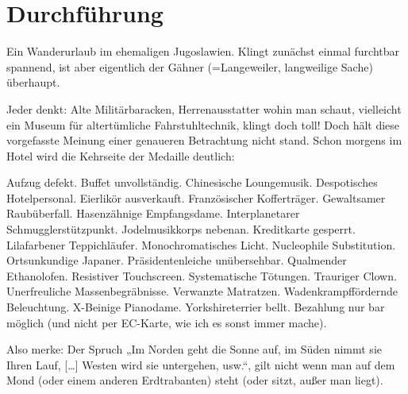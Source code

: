 \section{Durchführung}
\label{sec:Durchfuehrung}
Ein Wanderurlaub im ehemaligen Jugoslawien. Klingt zunächst einmal furchtbar spannend, ist aber eigentlich der Gähner (=Langeweiler, langweilige Sache) überhaupt.

Jeder denkt: Alte Militärbaracken, Herrenausstatter wohin man schaut, vielleicht ein Museum für altertümliche Fahrstuhltechnik, klingt doch toll! Doch hält diese vorgefasste Meinung einer genaueren Betrachtung nicht stand. Schon morgens im Hotel wird die Kehrseite der Medaille deutlich:

Aufzug defekt. Buffet unvollständig. Chinesische Loungemusik. Despotisches Hotelpersonal. Eierlikör ausverkauft. Französischer Kofferträger. Gewaltsamer Raubüberfall. Hasenzähnige Empfangsdame. Interplanetarer Schmugglerstützpunkt. Jodelmusikkorps nebenan. Kreditkarte gesperrt. Lilafarbener Teppichläufer. Monochromatisches Licht. Nucleophile Substitution. Ortsunkundige Japaner. Präsidentenleiche unübersehbar. Qualmender Ethanolofen. Resistiver Touchscreen. Systematische Tötungen. Trauriger Clown. Unerfreuliche Massenbegräbnisse. Verwanzte Matratzen. Wadenkrampffördernde Beleuchtung. X-Beinige Pianodame. Yorkshireterrier bellt. Bezahlung nur bar möglich (und nicht per EC-Karte, wie ich es sonst immer mache).

Also merke: Der Spruch „Im Norden geht die Sonne auf, im Süden nimmt sie Ihren Lauf, […] Westen wird sie untergehen, usw.“, gilt nicht wenn man auf dem Mond (oder einem anderen Erdtrabanten) steht (oder sitzt, außer man liegt).
